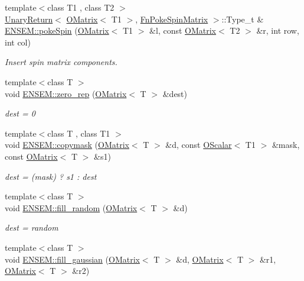 \begin{DoxyCompactItemize}
\item 
{\footnotesize template$<$class T1 , class T2 $>$ }\\\mbox{\hyperlink{structENSEM_1_1UnaryReturn}{Unary\+Return}}$<$ \mbox{\hyperlink{classENSEM_1_1OMatrix}{O\+Matrix}}$<$ T1 $>$, \mbox{\hyperlink{structENSEM_1_1FnPokeSpinMatrix}{Fn\+Poke\+Spin\+Matrix}} $>$\+::Type\+\_\+t \& \mbox{\hyperlink{group__obsmatrix_gade958f6bfe55cda547000e6badb137c7}{E\+N\+S\+E\+M\+::poke\+Spin}} (\mbox{\hyperlink{classENSEM_1_1OMatrix}{O\+Matrix}}$<$ T1 $>$ \&l, const \mbox{\hyperlink{classENSEM_1_1OMatrix}{O\+Matrix}}$<$ T2 $>$ \&r, int row, int col)
\begin{DoxyCompactList}\small\item\em Insert spin matrix components. \end{DoxyCompactList}\item 
{\footnotesize template$<$class T $>$ }\\void \mbox{\hyperlink{group__obsmatrix_gaf3d502e6c7fccd147d8023eda09b31b4}{E\+N\+S\+E\+M\+::zero\+\_\+rep}} (\mbox{\hyperlink{classENSEM_1_1OMatrix}{O\+Matrix}}$<$ T $>$ \&dest)
\begin{DoxyCompactList}\small\item\em dest = 0 \end{DoxyCompactList}\item 
{\footnotesize template$<$class T , class T1 $>$ }\\void \mbox{\hyperlink{group__obsmatrix_gaa09c3011b1e6555dcc6e4f9b51d1f5de}{E\+N\+S\+E\+M\+::copymask}} (\mbox{\hyperlink{classENSEM_1_1OMatrix}{O\+Matrix}}$<$ T $>$ \&d, const \mbox{\hyperlink{classENSEM_1_1OScalar}{O\+Scalar}}$<$ T1 $>$ \&mask, const \mbox{\hyperlink{classENSEM_1_1OMatrix}{O\+Matrix}}$<$ T $>$ \&s1)
\begin{DoxyCompactList}\small\item\em dest = (mask) ? s1 \+: dest \end{DoxyCompactList}\item 
{\footnotesize template$<$class T $>$ }\\void \mbox{\hyperlink{group__obsmatrix_ga3fed53cf2a765d06a2ba3d79f2516f35}{E\+N\+S\+E\+M\+::fill\+\_\+random}} (\mbox{\hyperlink{classENSEM_1_1OMatrix}{O\+Matrix}}$<$ T $>$ \&d)
\begin{DoxyCompactList}\small\item\em dest = random \end{DoxyCompactList}\item 
{\footnotesize template$<$class T $>$ }\\void \mbox{\hyperlink{group__obsmatrix_ga5abeb3bfc7329fc57387aefff992eb94}{E\+N\+S\+E\+M\+::fill\+\_\+gaussian}} (\mbox{\hyperlink{classENSEM_1_1OMatrix}{O\+Matrix}}$<$ T $>$ \&d, \mbox{\hyperlink{classENSEM_1_1OMatrix}{O\+Matrix}}$<$ T $>$ \&r1, \mbox{\hyperlink{classENSEM_1_1OMatrix}{O\+Matrix}}$<$ T $>$ \&r2)

\end{DoxyCompactItemize}
